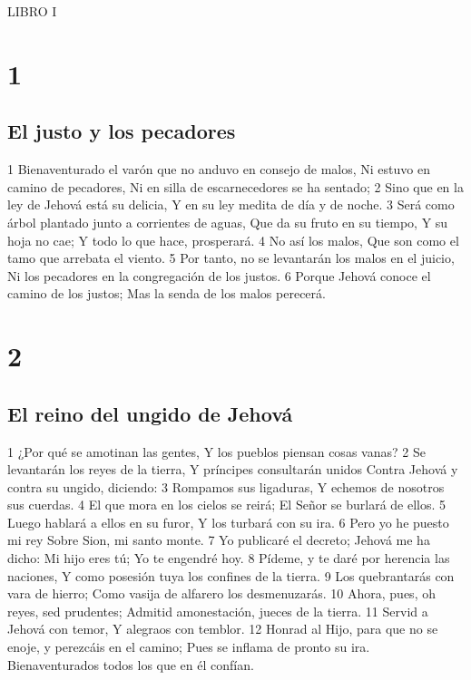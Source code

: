 

LIBRO I

\chapter{1}

\section*{El justo y los pecadores}

1 Bienaventurado el varón que no anduvo en consejo de malos,
Ni estuvo en camino de pecadores,
Ni en silla de escarnecedores se ha sentado;
2 Sino que en la ley de Jehová está su delicia,
Y en su ley medita de día y de noche.
3 Será como árbol plantado junto a corrientes de aguas,
Que da su fruto en su tiempo,
Y su hoja no cae;
Y todo lo que hace, prosperará.
4 No así los malos,
Que son como el tamo que arrebata el viento.
5 Por tanto, no se levantarán los malos en el juicio,
Ni los pecadores en la congregación de los justos.
6 Porque Jehová conoce el camino de los justos;
Mas la senda de los malos perecerá.

\chapter{2}

\section*{El reino del ungido de Jehová}

1 ¿Por qué se amotinan las gentes,
Y los pueblos piensan cosas vanas?
2 Se levantarán los reyes de la tierra,
Y príncipes consultarán unidos
Contra Jehová y contra su ungido, diciendo:
3 Rompamos sus ligaduras,
Y echemos de nosotros sus cuerdas.
4 El que mora en los cielos se reirá;
El Señor se burlará de ellos.
5 Luego hablará a ellos en su furor,
Y los turbará con su ira.
6 Pero yo he puesto mi rey
Sobre Sion, mi santo monte.
7 Yo publicaré el decreto;
Jehová me ha dicho: Mi hijo eres tú;
Yo te engendré hoy.
8 Pídeme, y te daré por herencia las naciones,
Y como posesión tuya los confines de la tierra.
9 Los quebrantarás con vara de hierro;
Como vasija de alfarero los desmenuzarás.
10 Ahora, pues, oh reyes, sed prudentes;
Admitid amonestación, jueces de la tierra.
11 Servid a Jehová con temor,
Y alegraos con temblor.
12 Honrad al Hijo, para que no se enoje, y perezcáis en el camino;
Pues se inflama de pronto su ira.
Bienaventurados todos los que en él confían.

